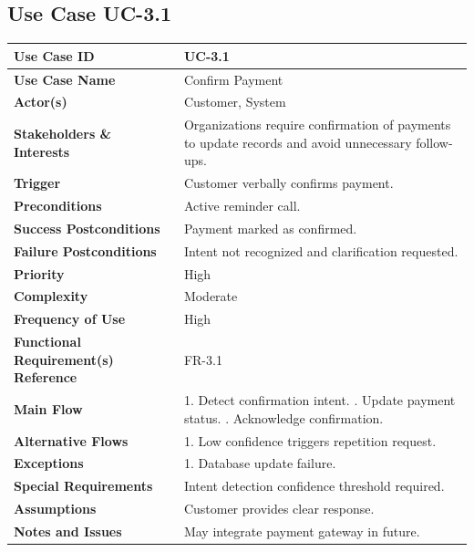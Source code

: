 \documentclass[12pt,a4paper]{report}
\begin{document}
\subsection*{Use Case UC-3.1}
\begin{longtable}{|p{4cm}|p{9cm}|}
\hline
\textbf{Use Case ID} & UC-3.1 \\ \hline
\textbf{Use Case Name} & Confirm Payment \\ \hline
\textbf{Actor(s)} & Customer, System \\ \hline
\textbf{Stakeholders \& Interests} & Organizations require confirmation of payments to update records and avoid unnecessary follow-ups. \\ \hline
\textbf{Trigger} & Customer verbally confirms payment. \\ \hline
\textbf{Preconditions} & Active reminder call. \\ \hline
\textbf{Success Postconditions} & Payment marked as confirmed. \\ \hline
\textbf{Failure Postconditions} & Intent not recognized and clarification requested. \\ \hline
\textbf{Priority} & High \\ \hline
\textbf{Complexity} & Moderate \\ \hline
\textbf{Frequency of Use} & High \\ \hline
\textbf{Functional Requirement(s) Reference} & FR-3.1 \\ \hline
\textbf{Main Flow} &
1. Detect confirmation intent. \newline
2. Update payment status. \newline
3. Acknowledge confirmation. \\ \hline
\textbf{Alternative Flows} &
1. Low confidence triggers repetition request. \\ \hline
\textbf{Exceptions} &
1. Database update failure. \\ \hline
\textbf{Special Requirements} &
Intent detection confidence threshold required. \\ \hline
\textbf{Assumptions} &
Customer provides clear response. \\ \hline
\textbf{Notes and Issues} &
May integrate payment gateway in future. \\ \hline
\end{longtable}

\end{document}
